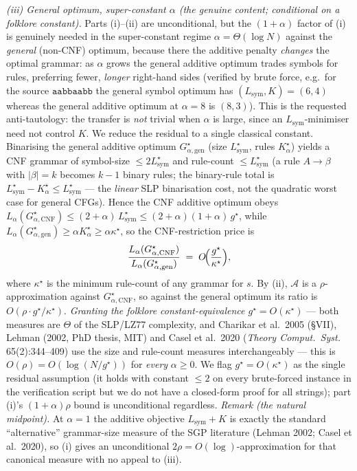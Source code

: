 \documentclass[
]{article}
\begin{document}
\emph{(iii) General optimum, super-constant $\alpha$ (the genuine
content; conditional on a folklore constant).} Parts (i)--(ii) are
unconditional, but the $(1+\alpha)$ factor of (i) is genuinely needed
in the super-constant regime $\alpha = \Theta(\log N)$ against the
\emph{general} (non-CNF) optimum, because there the additive penalty
\emph{changes} the optimal grammar: as $\alpha$ grows the general
additive optimum trades symbols for rules, preferring fewer,
\emph{longer} right-hand sides (verified by brute force, e.g.\ for the
source $\mathtt{aabbaabb}$ the general symbol optimum has
$(L_{\mathrm{sym}}, K) = (6,4)$ whereas the general additive optimum at
$\alpha=8$ is $(8,3)$). This is the requested anti-tautology: the
transfer is \emph{not} trivial when $\alpha$ is large, since an
$L_{\mathrm{sym}}$-minimiser need not control $K$. We reduce the residual
to a single classical constant. Binarising the general additive optimum
$G^\star_{\alpha,\mathrm{gen}}$ (size $L_{\mathrm{sym}}^\star$, rules
$K^\star_\alpha$) yields a CNF grammar of symbol-size
$\leq 2L_{\mathrm{sym}}^\star$ and rule-count
$\leq L_{\mathrm{sym}}^\star$ (a rule $A \to \beta$ with $|\beta| = k$
becomes $k-1$ binary rules; the binary-rule total is
$L_{\mathrm{sym}}^\star - K^\star_\alpha \leq L_{\mathrm{sym}}^\star$ ---
the \emph{linear} SLP binarisation cost, not the quadratic worst case
for general CFGs). Hence the CNF additive optimum obeys
$L_\alpha(G^\star_{\alpha,\mathrm{CNF}}) \leq
(2+\alpha)\,L_{\mathrm{sym}}^\star \leq (2+\alpha)(1+\alpha)\,g^\star$,
while $L_\alpha(G^\star_{\alpha,\mathrm{gen}}) \geq \alpha K^\star_\alpha
\geq \alpha\kappa^\star$, so the CNF-restriction price is
\[
\frac{L_\alpha(G^\star_{\alpha,\mathrm{CNF}})}{L_\alpha(G^\star_{\alpha,\mathrm{gen}})}
\;=\; O\!\Bigl(\frac{g^\star}{\kappa^\star}\Bigr),
\]
where $\kappa^\star$ is the minimum rule-count of any grammar for $s$.
By (ii), $\mathcal A$ is a $\rho$-approximation against
$G^\star_{\alpha,\mathrm{CNF}}$, so against the general optimum its ratio
is $O(\rho\cdot g^\star/\kappa^\star)$. \emph{Granting the folklore
constant-equivalence $g^\star = O(\kappa^\star)$} --- both measures are
$\Theta$ of the SLP/LZ77 complexity, and Charikar et al.\ 2005 (\S VII),
Lehman (2002, PhD thesis, MIT) and Casel et al.\ 2020 (\emph{Theory
Comput.\ Syst.} 65(2):344--409) use the size and rule-count measures
interchangeably --- this is $O(\rho) = O(\log(N/g^\star))$ for
\emph{every} $\alpha \geq 0$. We flag $g^\star = O(\kappa^\star)$ as the
single residual assumption (it holds with constant $\leq 2$ on every
brute-forced instance in the verification script but we do not have a
closed-form proof for all strings); part (i)'s $(1+\alpha)\rho$ bound is
unconditional regardless. \emph{Remark (the natural midpoint).} At
$\alpha = 1$ the additive objective $L_{\mathrm{sym}} + K$ is exactly the
standard ``alternative'' grammar-size measure of the SGP literature
(Lehman 2002; Casel et al.\ 2020), so (i) gives an unconditional
$2\rho = O(\log)$-approximation for that canonical measure with no
appeal to (iii).
\end{document}
